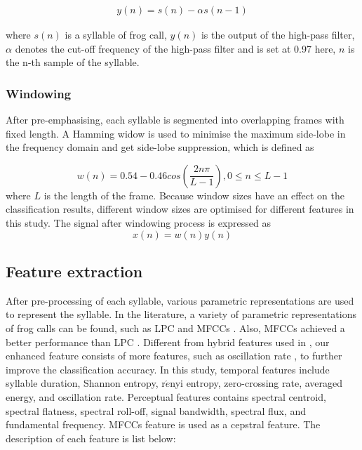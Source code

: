 \begin{align}
y(n) = s(n)-\alpha s(n-1)
\end{align}

where $s(n)$ is a syllable of frog call, $y(n)$ is the output of the high-pass filter, $\alpha$ denotes the cut-off frequency of the high-pass filter and is set at 0.97 here, $n$ is the n-th sample of the syllable. 

\subsubsection{Windowing}
After pre-emphasising, each syllable is segmented into overlapping frames with fixed length. A Hamming widow is used to minimise the maximum side-lobe in the frequency domain and get side-lobe suppression, which is defined as

\begin{equation}
w(n)=0.54-0.46cos(\frac{2n\pi}{L-1}), 0 \leq n \leq L-1
\end{equation}
where $L$ is the length of the frame. Because window sizes have an effect on the classification results, different window sizes are optimised for different features in this study. The signal after windowing process is expressed as
\begin{equation}
x(n) = w(n)y(n)
\end{equation}

\subsection{Feature extraction}
After pre-processing of each syllable, various parametric representations are used to represent the syllable. In the literature, a variety of parametric representations of frog calls can be found, such as LPC and MFCCs \citep{yuan2012frog, jaafar2013automatic, bedoya2014automatic}.
Also, MFCCs achieved a better performance than LPC \citep{yuan2012frog}. Different from hybrid features used in \citep{huang2009frog, han2011acoustic, Gingras2013}, our enhanced  feature consists of more features, such as oscillation rate \citep{Xie1504:Acoustic}, to further improve the classification accuracy. In this study, temporal features include syllable duration, Shannon entropy, r$\acute{e}$nyi entropy, zero-crossing rate, averaged energy, and oscillation rate. Perceptual features contains spectral centroid, spectral flatness, spectral roll-off, signal bandwidth, spectral flux, and fundamental frequency. MFCCs feature is used as a cepstral feature. The description of each feature is list below:

